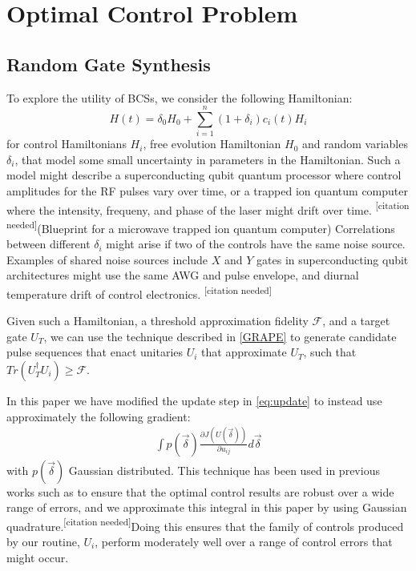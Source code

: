\documentclass[aps,nofootinbib,pra,notitlepage,twocolumn]{revtex4-1}
\newcommand{\needcite}{{\color{blue}\textsuperscript{[citation needed]}}}
\begin{document}
\section{Optimal Control Problem}\label{ocp}
\subsection{Random Gate Synthesis}
To explore the utility of BCSs, we consider the following Hamiltonian:
\begin{equation}\label{eq:2}
  H(t) = \delta_0H_0 + \sum_{i=1}^n (1 + \delta_i)c_i(t)H_i
\end{equation}
for control Hamiltonians $H_i$, free evolution Hamiltonian $H_0$ and random variables $\delta_i$, that model some small uncertainty in parameters in the Hamiltonian. Such a model might describe a superconducting qubit quantum processor where control amplitudes for the RF pulses vary over time, or a trapped ion quantum computer where the intensity, frequeny, and phase of the laser might drift over time. \needcite(Blueprint for a microwave trapped ion quantum computer) Correlations between different $\delta_i$ might arise if two of the controls have the same noise source. Examples of shared noise sources include $X$ and $Y$ gates in superconducting qubit architectures might use the same AWG and pulse envelope, and diurnal temperature drift of control electronics. \needcite

Given such a Hamiltonian, a threshold approximation fidelity $\mathcal{F}$, and a target gate $U_T$, we can use the technique described in \ref{GRAPE} to generate candidate pulse sequences that enact unitaries $U_i$ that approximate $U_T$, such that $Tr(U_T^{\dagger}U_i) \ge \mathcal{F}$. 

In this paper we have modified the update step in \ref{eq:update} to instead use approximately the following gradient:
\begin{align}\label{quadrature}
\int p(\vec{\delta})\frac{\partial J(U(\vec{\delta}))}{\partial u_{ij}} d\vec{\delta}
\end{align}
with $p(\vec{\delta})$ Gaussian distributed. This technique has been used in previous works such as \cite{Goerz2014} to ensure that the optimal control results are robust over a wide range of errors, and we approximate this integral in this paper by using Gaussian quadrature.\needcite Doing this ensures that the family of controls produced by our routine, $U_i$, perform moderately well over a range of control errors that might occur.
\end{document}
